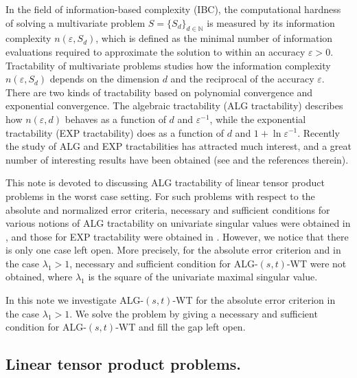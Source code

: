 \documentclass{amsart}
\numberwithin{equation}{section}
\def\vz{\varepsilon}
\def\lz{\lambda}
\begin{document}
In the field of information-based complexity (IBC), the
computational hardness of solving a multivariate  problem $S =
\{S_d\}_{d \in \mathbb{N}}$ is measured by its information
complexity $n(\varepsilon, S_d)$, which is defined as the minimal
number of information evaluations required to approximate the
solution to within an accuracy $\varepsilon > 0$. Tractability of
multivariate problems studies how the information complexity
$n(\varepsilon, S_d)$  depends on  the dimension  $d$ and the
reciprocal of the accuracy $\vz$. There are two kinds of
tractability based on polynomial convergence and exponential
convergence. The algebraic tractability (ALG tractability)
describes how  $n(\vz, d)$ behaves as a function of $d$ and
$\vz^{-1}$, while the exponential tractability (EXP tractability)
does as a function of $d$ and $1+\ln\vz^{-1}$. Recently the  study
of ALG and EXP tractabilities has attracted much interest, and a
great number of interesting results
 have been obtained (see
\cite{ CW1, DKPW14, DLPW11, GW11, IKPW16a, KW19, KPW, NW08, NW10, NW12,
PP14, PPW17, S13, SW15, W19, X15} and the references therein).


This note is devoted to discussing ALG tractability of linear
tensor product problems in the worst case setting. For such
problems with respect to the absolute and normalized error
criteria, necessary and sufficient conditions for various notions
of ALG tractability on univariate singular values were obtained in
\cite{NW08,  S13, GW11, SW15}, and  those for  EXP tractability
were obtained in \cite{HKW19, PP14, PPW17}. However, we notice
that there is only one case left open. More precisely, for the
absolute error criterion and in the case  $\lz_1>1$,  necessary
and sufficient condition for
 ALG-$(s,t)$-WT  were not obtained, where $\lz_1$ is  the square of the
 univariate maximal
singular value.




  In this note we investigate  ALG-$(s, t)$-WT   for the absolute error criterion in the case  $\lz_1>1$. We  solve the
problem by giving a necessary and sufficient condition for
 ALG-$(s,t)$-WT and fill  the  gap left open.











\subsection{Linear tensor product problems.}
\end{document}
